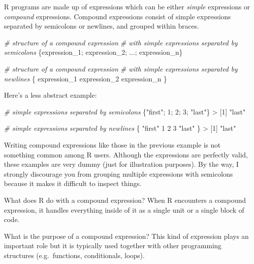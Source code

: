 \documentclass[
]{book}
\newenvironment{Shaded}{\begin{snugshade}}{\end{snugshade}}
\newcommand{\CommentTok}[1]{\textcolor[rgb]{0.56,0.35,0.01}{\textit{#1}}}
\newcommand{\DecValTok}[1]{\textcolor[rgb]{0.00,0.00,0.81}{#1}}
\newcommand{\NormalTok}[1]{#1}
\newcommand{\SpecialCharTok}[1]{\textcolor[rgb]{0.00,0.00,0.00}{#1}}
\newcommand{\StringTok}[1]{\textcolor[rgb]{0.31,0.60,0.02}{#1}}
\begin{document}
R programs are made up of expressions which can be either \emph{simple} expressions
or \emph{compound} expressions. Compound expressions consist of simple expressions
separated by semicolons or newlines, and grouped within braces.

\begin{Shaded}
\begin{Highlighting}[]
\CommentTok{\# structure of a compound expression}
\CommentTok{\# with simple expressions separated by semicolons}
\NormalTok{\{expression\_1; expression\_2; ...; expression\_n\}}

\CommentTok{\# structure of a compound expression}
\CommentTok{\# with simple expressions separated by newlines}
\NormalTok{\{}
\NormalTok{  expression\_1}
\NormalTok{  expression\_2}
\NormalTok{  expression\_n}
\NormalTok{\}}
\end{Highlighting}
\end{Shaded}

Here's a less abstract example:

\begin{Shaded}
\begin{Highlighting}[]
\CommentTok{\# simple expressions separated by semicolons}
\NormalTok{\{}\StringTok{"first"}\NormalTok{; }\DecValTok{1}\NormalTok{; }\DecValTok{2}\NormalTok{; }\DecValTok{3}\NormalTok{; }\StringTok{"last"}\NormalTok{\}}
\SpecialCharTok{\textgreater{}}\NormalTok{ [}\DecValTok{1}\NormalTok{] }\StringTok{"last"}

\CommentTok{\# simple expressions separated by newlines}
\NormalTok{\{}
  \StringTok{"first"}
  \DecValTok{1}
  \DecValTok{2}
  \DecValTok{3}
  \StringTok{"last"}
\NormalTok{\}}
\SpecialCharTok{\textgreater{}}\NormalTok{ [}\DecValTok{1}\NormalTok{] }\StringTok{"last"}
\end{Highlighting}
\end{Shaded}

Writing compound expressions like those in the previous example is not
something common among R users. Although the expressions are perfectly valid,
these examples are very dummy (just for illustration purposes). By the way,
I strongly discourage you from grouping multiple expressions with semicolons
because it makes it difficult to inspect things.

What does R do with a compound expression? When R encounters a compound
expression, it handles everything inside of it as a single unit or a single
block of code.

What is the purpose of a compound expression? This kind of expression plays an
important role but it is typically used together with other programming
structures (e.g.~functions, conditionals, loops).
\end{document}
